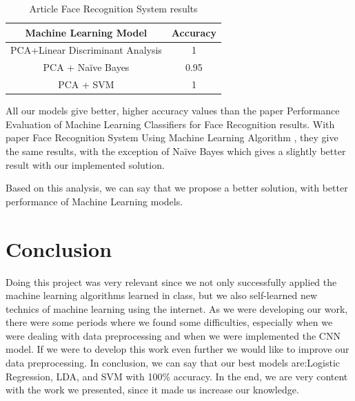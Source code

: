 \documentclass[conference]{IEEEtran}
\begin{document}
\begin{table}[ht!]
    \centering
    \caption{Article Face Recognition System results} 
    \begin{tabular}{||c| c ||} 
    \hline
     Machine Learning Model & Accuracy \\ [0.5ex] 
     \hline\hline
     PCA+Linear Discriminant Analysis & 1 \\
     \hline
    PCA + Naïve Bayes & 0.95 \\ 
    \hline
    PCA + SVM & 1 \\ 
    \hline
    \end{tabular}
    \label{tab:tab_Face_Recognition_System_article}
\end{table}

All our models give better, higher accuracy values than the paper Performance Evaluation of Machine Learning Classifiers for Face Recognition \cite{9716171} results. With paper Face Recognition System Using Machine Learning Algorithm \cite{9137850}, they give the same results, with the exception of Naïve Bayes which gives a slightly better result with our implemented solution.

Based on this analysis, we can say that we propose a better solution, with better performance of Machine Learning models.

\section{Conclusion}

Doing this project was very relevant since we not only successfully applied the machine learning algorithms learned in class, but we also self-learned new technics of machine learning using the internet. 
As we were developing our work, there were some periods where we found some difficulties, especially when we were dealing with data preprocessing and when we were implemented the CNN model. If we were to develop this work even further we would like to improve our data preprocessing. 
In conclusion, we can say that our best models are:Logistic Regression, LDA, and SVM with 100\% accuracy.
 In the end, we are very content with the work we presented, since it made us increase our knowledge.


\printbibliography
\end{document}
